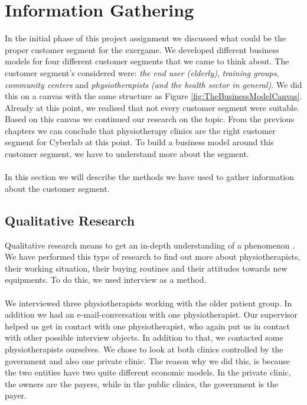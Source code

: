 \chapter{Information Gathering}
In the initial phase of this project assignment we discussed what could be the proper customer segment for the exergame. We developed different business models for four different customer segments that we came to think about. The customer segment's considered were: \emph{the end user (elderly)}, \emph{training groups}, \emph{community centers} and \emph{physiotherapists (and the health sector in general)}.  We did this on a canvas with the same structure as Figure  \ref{fig:TheBusinessModelCanvas}. Already at this point, we realised that not every customer segment were suitable. Based on this canvas we continued our research on the topic. From the previous chapters we can conclude that physiotherapy clinics are the right customer segment for Cyberlab at this point. To build a business model around this customer segment, we have to understand more about the segment. \\ \\
In this section we will describe the methods we have used to gather information about the customer segment.

\section{Qualitative Research}
Qualitative research means to get an in-depth understanding of a phenomenon \cite{interview2}. We have performed this type of research to find out more about physiotherapists, their working situation, their buying routines and their attitudes towards new equipments. To do this, we used interview as a method. \\ \\
We interviewed three physiotherapists working with the older patient group. In addition we had an e-mail-conversation with one physiotherapist. Our supervisor helped us get in contact with one physiotherapist, who again put us in contact with other possible interview objects. In addition to that, we contacted some physiotherapists ourselves. We chose to look at both clinics controlled by the government and also one private clinic. The reason why we did this, is because the two entities have two quite different economic models. In the private clinic, the owners are the payers, while in the public clinics, the government is the payer.

